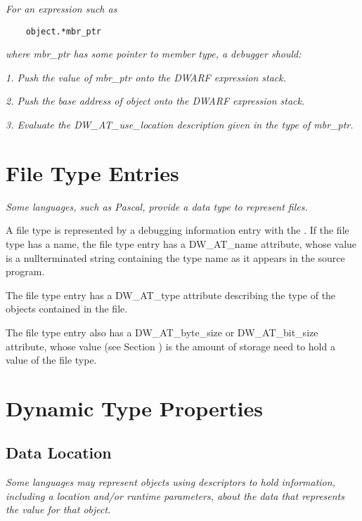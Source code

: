 \textit{For an expression such as}

\begin{lstlisting}
    object.*mbr_ptr
\end{lstlisting}
\textit{where mbr\_ptr has some pointer to member type, a debugger should:}

\textit{1. Push the value of mbr\_ptr onto the DWARF expression stack.}

\textit{2. Push the base address of object onto the DWARF expression stack.}

\textit{3. Evaluate the DW\_AT\_use\_location description 
given in the type of mbr\_ptr.}

\section{File Type Entries}
\label{chap:filetypeentries}

\textit{Some languages, such as Pascal, provide a data type to represent 
files.}

A file type is represented by a debugging information entry
with the 
. 
If the file type has a name,
the file type entry has a DW\_AT\_name attribute, whose value
is a null\dash terminated string containing the type name as it
appears in the source program.

The file type entry has a DW\_AT\_type attribute describing
the type of the objects contained in the file.

The file type entry also has a DW\_AT\_byte\_size or
DW\_AT\_bit\_size attribute, whose value 
(see Section )
is the amount of storage need to hold a value of the file type.

\section{Dynamic Type Properties}
\label{chap:dynamictypeproperties}
\subsection{Data Location}
\label{chap:datalocation}

\textit{Some languages may represent objects using descriptors to hold
information, including a location and/or run\dash time parameters,
about the data that represents the value for that object.}

